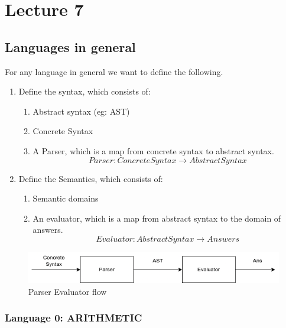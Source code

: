 \chapter{Lecture 7}
    
    \section{Languages in general}
    
    For any language in general we want to define the following.
    \begin{enumerate}
        \item Define the syntax, which consists of:
            \begin{enumerate}
                \item Abstract syntax (eg: AST)
                \item Concrete Syntax
                \item A Parser, which is a map from concrete syntax to abstract syntax.
                $$
                Parser : Concrete Syntax \rightarrow Abstract Syntax
                $$
            \end{enumerate}
        \item Define the Semantics, which consists of:
            \begin{enumerate}
                \item Semantic domains
                \item An evaluator, which is a map from abstract syntax to the domain of answers.
                $$
                Evaluator : Abstract Syntax \rightarrow Answers 
                $$
            \end{enumerate}
    \end{enumerate}
    
    \begin{figure}[htbp]
        \center
        \includegraphics[scale=0.6]{images/lecture7/parser-evaluator.png}
        \caption{Parser Evaluator flow}
    \end{figure}
    
    \subsection{Language 0: ARITHMETIC}
    
